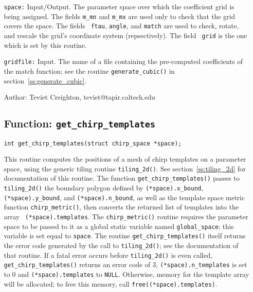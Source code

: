 \begin{description}
\item{\tt space:}
  Input/Output.  The parameter space over which the coefficient grid
  is being assigned.  The fields {\tt m\_mn} and {\tt m\_mx} are used
  only to check that the grid covers the space.  The fields {\tt
  ftau}, {\tt angle}, and {\tt match} are used to check, rotate, and
  rescale the grid's coordinate system (repsectively).  The field {\tt
  grid} is the one which is set by this routine.

\item{\tt gridfile:}
  Input.  The name of a file containing the pre-computed coefficients
  of the match function; see the routine {\tt generate\_cubic()} in
  section~\ref{ss:generate_cubic}.

\end{description}

\begin{description}
\item{Author:}
  Teviet Creighton, teviet@tapir.caltech.edu
\end{description}


\clearpage
\subsection{Function: {\tt get\_chirp\_templates}}
\label{ss:get_chirp_templates}

\begin{verbatim}
int get_chirp_templates(struct chirp_space *space);
\end{verbatim}
This routine computes the positions of a mesh of chirp templates on a
parameter space, using the generic tiling routine {\tt tiling\_2d()}.
See section~\ref{ss:tiling_2d} for documentation of this routine.  The
function {\tt get\_chirp\_templates()} passes to {\tt tiling\_2d()}
the boundary polygon defined by {\tt (*space).x\_bound}, {\tt
(*space).y\_bound}, and {\tt (*space).n\_bound}, as well as the
template space metric function {\tt chirp\_metric()}, then converts
the returned list of templates into the array {\tt
(*space).templates}.  The {\tt chirp\_metric()} routine requires the
parameter space to be passed to it as a global static variable named
{\tt global\_space}; this variable is set equal to {\tt *space}.  The
routine {\tt get\_chirp\_templates()} itself returns the error code
generated by the call to {\tt tiling\_2d()}; see the documentation of
that routine.  If a fatal error occurs before {\tt tiling\_2d()} is
even called, {\tt get\_chirp\_templates()} returns an error code of 3,
{\tt (*space).n\_templates} is set to 0 and {\tt (*space).templates}
to {\tt NULL}.  Otherwise, memory for the template array will be
allocated; to free this memory, call {\tt free((*space).templates)}.

